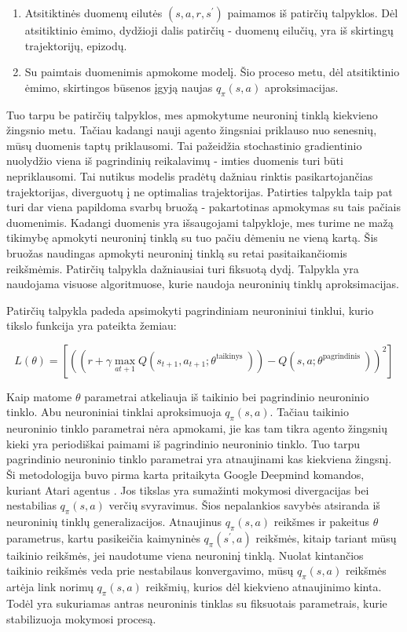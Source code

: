 \documentclass[a4paper, 12pt]{article}
\begin{document}
\begin{enumerate}
  \addtolength{\itemsep}{-0.5\baselineskip} 
  \item Atsitiktinės duomenų eilutės $(s,a,r,s^\prime)$ paimamos iš patirčių talpyklos. Dėl atsitiktinio ėmimo, dydžioji dalis patirčių - duomenų eilučių, yra iš skirtingų trajektorijų, epizodų.
  \item Su paimtais duomenimis apmokome modelį. Šio proceso metu, dėl atsitiktinio ėmimo, skirtingos būsenos įgyją naujas $q_{\pi}(s, a)$ aproksimacijas. 
\end{enumerate}

Tuo tarpu be patirčių talpyklos, mes apmokytume neuroninį tinklą kiekvieno žingsnio metu. Tačiau kadangi nauji agento žingsniai priklauso nuo senesnių, mūsų duomenis taptų priklausomi. Tai pažeidžia stochastinio gradientinio nuolydžio viena iš pagrindinių reikalavimų - imties duomenis turi būti nepriklausomi. Tai nutikus modelis pradėtų dažniau rinktis pasikartojančias trajektorijas, diverguotų į ne optimalias trajektorijas. Patirties talpykla taip pat turi dar viena papildoma svarbų bruožą - pakartotinas apmokymas su tais pačiais duomenimis. Kadangi duomenis yra išsaugojami talpykloje, mes turime ne mažą tikimybę apmokyti neuroninį tinklą su tuo pačiu dėmeniu ne vieną kartą. Šis bruožas naudingas apmokyti neuroninį tinklą su retai pasitaikančiomis reikšmėmis. Patirčių talpykla dažniausiai turi fiksuotą dydį. Talpykla yra naudojama visuose algoritmuose, kurie naudoja neuroninių tinklų aproksimacijas. 

Patirčių talpykla padeda apsimokyti pagrindiniam neuroniniui tinklui, kurio tikslo funkcija yra pateikta žemiau:

\begin{equation}
L(\theta)=\left[\left(\left(r+\gamma \max _{a t+1} Q\left(s_{t+1}, a_{t+1} ; \theta^{\text {taikinys }}\right)\right)-Q\left(s, a ; \theta^{\text {pagrindinis }}\right)\right)^{2}\right]
\end{equation}

Kaip matome $\theta$ parametrai atkeliauja iš taikinio bei pagrindinio neuroninio tinklo. Abu neuroniniai tinklai aproksimuoja $q_{\pi}(s, a)$. Tačiau taikinio neuroninio tinklo parametrai nėra apmokami, jie kas tam tikra agento žingsnių kieki yra periodiškai paimami iš pagrindinio neuroninio tinklo. Tuo tarpu pagrindinio neuroninio tinklo parametrai yra atnaujinami kas kiekviena žingsnį. Ši metodologija buvo pirma karta pritaikyta Google Deepmind komandos, kuriant Atari agentus \cite{GoogleDeepQLearning}. Jos tikslas yra sumažinti mokymosi divergacijas bei nestabilias $q_{\pi}(s, a)$ verčių svyravimus. Šios nepalankios savybės atsiranda iš neuroninių tinklų generalizacijos. Atnaujinus $q_{\pi}(s, a)$ reikšmes ir pakeitus $\theta$ parametrus, kartu pasikeičia kaimyninės $q_{\pi}(s^\prime, a)$ reikšmės, kitaip tariant mūsų taikinio reikšmės, jei naudotume viena neuroninį tinklą. Nuolat kintančios taikinio reikšmės veda prie nestabilaus konvergavimo, mūsų $q_{\pi}(s, a)$ reikšmės artėja link norimų $q_{\pi}(s, a)$ reikšmių, kurios dėl kiekvieno atnaujinimo kinta. Todėl yra sukuriamas antras neuroninis tinklas su fiksuotais parametrais, kurie stabilizuoja mokymosi procesą.
\end{document}
